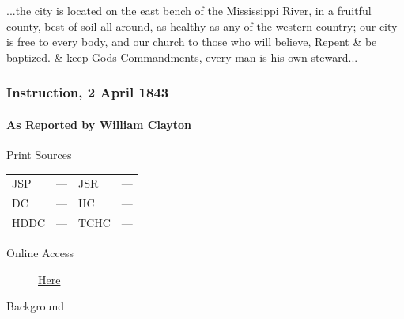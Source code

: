 				...the city is located on the east bench of the Mississippi River, in a fruitful county, best of soil all around, as healthy as any of the western country; our city is free to every body, and our church to those who will believe, Repent \& be baptized. \& keep Gods Commandments, every man is his own steward...
				
		\subsubsection{Instruction, 2 April 1843}
			\label{EMS-1843-JS-2-APR-1843}
			
			\paragraph{As Reported by William Clayton}
				\label{EMS-1843-JS-2-APR-1843-WC}
			
				\begin{description}
					\item[Print Sources]
				\end{description}

					\begin{tabular}{p{0.5in}p{1in}p{0.5in}p{1in}}
					JSP	 	& ---		& JSR 		& --- \\
					DC	 	& ---		& HC 		& --- \\
					HDDC 	& ---		& TCHC 		& --- \\
					\end{tabular}
				
				\begin{description}
					\item[Online Access] \href{https://www.josephsmithpapers.org/paper-summary/instruction-2-april-1843-as-reported-by-william-clayton/1}{Here}
				\end{description}
				
				\begin{description}
					\item[Background]
				\end{description}
				
				
